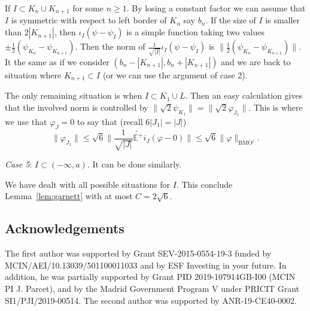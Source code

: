 \documentclass[psamsfonts]{amsart}
\newcommand{\BMOc}{\mathrm{BMO}^c}
\begin{document}
    If $I\subset K_n\cup K_{n+1}$ for some $n\geq 1$. By losing a constant factor we can assume that $I$ is symmetric with respect to left border of $K_n$ say $b_n$.
    If the size of $I$ is smaller than $2|K_{n+1}|$, then $\iota_I(\psi -\psi_I) $ is a simple function taking two values $\pm\frac 1 2  (\psi_{K_n}-\psi_{K_{n+1}})$. Then the norm of $\frac 1 {\sqrt{|I|}}\iota_I(\psi -\psi_I)$ is
    $\|\frac 1 2  (\psi_{K_n}-\psi_{K_{n+1}})\|$. It the same as if we consider
    $(b_n-|K_{n+1}|,b_n+|K_{n+1}|)$ and we are back to situation where $K_{n+1}\subset I$ (or we can use the argument of case 2).


    The only remaining situation is when $I\subset K_1\cup L$. Then an easy calculation gives that the involved norm is controlled
    by $\|\sqrt{2} \psi_{K_1}\|=\|\sqrt{2} \varphi_{J_1}\|$. This is where we use that $\varphi_J=0$ to say that (recall $6|J_1|=|J|$)
    $$\|\varphi_{J_1}\|\leq \sqrt 6 \| \frac 1{\sqrt{| J|}}
    \widetilde {\mathbb E^+} i_J (\varphi -0)\|\leq \sqrt{6} \|\varphi\|_{\BMOc}.$$ 

    {\it Case 5}: $I\subset (-\infty,a)$. It can be done similarly.

  
    We have dealt with all possible situations for $I$. This conclude Lemma~\ref{lem:garnett} with at most $C=2\sqrt 6$.



\subsection*{Acknowledgements}
The first author was supported by Grant SEV-2015-0554-19-3 funded by MCIN/AEI/10.13039/501100011033 and by ESF Investing in your future. In addition, he was partially supported by Grant PID 2019-107914GB-I00 (MCIN PI J. Parcet), and by the Madrid Government Program V under PRICIT Grant SI1/PJI/2019-00514. The second author was supported by ANR-19-CE40-0002.

    
    
\end{document}
